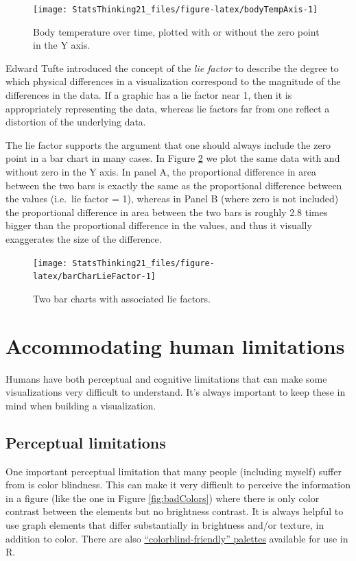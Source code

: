 \documentclass[12pt,]{book}
\theoremstyle{definition}
\theoremstyle{definition}
\theoremstyle{definition}
\theoremstyle{remark}
\begin{document}
\begin{figure}
\texttt{[image: StatsThinking21\_files/figure-latex/bodyTempAxis-1]} \caption{Body temperature over time, plotted with or without the zero point in the Y axis.}\label{fig:bodyTempAxis}
\end{figure}

Edward Tufte introduced the concept of the \emph{lie factor} to describe the degree to which physical differences in a visualization correspond to the magnitude of the differences in the data. If a graphic has a lie factor near 1, then it is appropriately representing the data, whereas lie factors far from one reflect a distortion of the underlying data.

The lie factor supports the argument that one should always include the zero point in a bar chart in many cases. In Figure \ref{fig:barCharLieFactor} we plot the same data with and without zero in the Y axis. In panel A, the proportional difference in area between the two bars is exactly the same as the proportional difference between the values (i.e.~lie factor = 1), whereas in Panel B (where zero is not included) the proportional difference in area between the two bars is roughly 2.8 times bigger than the proportional difference in the values, and thus it visually exaggerates the size of the difference.

\begin{figure}
\texttt{[image: StatsThinking21\_files/figure-latex/barCharLieFactor-1]} \caption{Two bar charts with associated lie factors.}\label{fig:barCharLieFactor}
\end{figure}

\hypertarget{accommodating-human-limitations}{%
\section{Accommodating human limitations}\label{accommodating-human-limitations}}

Humans have both perceptual and cognitive limitations that can make some visualizations very difficult to understand. It's always important to keep these in mind when building a visualization.

\hypertarget{perceptual-limitations}{%
\subsection{Perceptual limitations}\label{perceptual-limitations}}

One important perceptual limitation that many people (including myself) suffer from is color blindness. This can make it very difficult to perceive the information in a figure (like the one in Figure \ref{fig:badColors}) where there is only color contrast between the elements but no brightness contrast. It is always helpful to use graph elements that differ substantially in brightness and/or texture, in addition to color. There are also \href{http://www.cookbook-r.com/Graphs/Colors_(ggplot2)/\#a-colorblind-friendly-palette}{``colorblind-friendly'' palettes} available for use in R.
\end{document}
